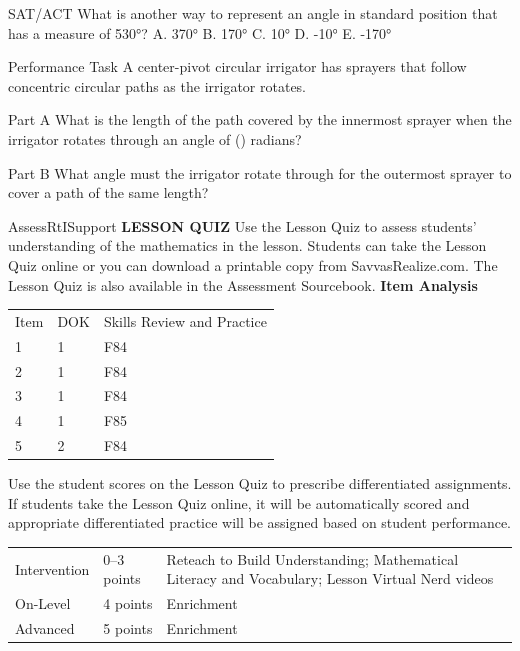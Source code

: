 \documentclass{article}
\newenvironment{practice}[2]{}{}        %
\newenvironment{te-addendum}[2]{}{}     %
\newcommand{\answer}[1]{}               %
\newcommand{\placeholder}[2]{}          %
\begin{document}
\begin{practice}{48}{1}
SAT/ACT What is another way to represent an angle in standard position that has a measure of 530°?
A. 370°
B. 170°
C. 10°
D. -10°
E. -170°
\answer{B}
\end{practice}
\begin{practice}{49}{2}
Performance Task A center-pivot circular irrigator has sprayers that follow concentric circular paths as the irrigator rotates.
\placeholder{illustration}{Green circular crop field in perspective with concentric sprayer paths. Horizontal white radial measure from center to innermost circle is20 m; from that circle to outermost circle is400 m. Other fields and hills in background.}
Part A What is the length of the path covered by the innermost sprayer when the irrigator rotates through an angle of () radians?
\answer{(\approx94) m}
Part B What angle must the irrigator rotate through for the outermost sprayer to cover a path of the same length?
\answer{(\approx0.224) radians}
\end{practice}
\begin{te-addendum}{Assess}{RtISupport}
\textbf{LESSON QUIZ}
Use the Lesson Quiz to assess students' understanding of the mathematics in the lesson.
Students can take the Lesson Quiz online or you can download a printable copy from SavvasRealize.com. The Lesson Quiz is also available in the Assessment Sourcebook.
\textbf{Item Analysis}
\begin{tabular}{lll}
Item & DOK & Skills Review and Practice \\
1 & 1 & F84 \\
2 & 1 & F84 \\
3 & 1 & F84 \\
4 & 1 & F85 \\
5 & 2 & F84 \\
\end{tabular}
Use the student scores on the Lesson Quiz to prescribe differentiated assignments.
If students take the Lesson Quiz online, it will be automatically scored and appropriate differentiated practice will be assigned based on student performance.
\begin{tabular}{lll}
Intervention & 0--3 points & Reteach to Build Understanding; Mathematical Literacy and Vocabulary; Lesson Virtual Nerd videos \\
On-Level & 4 points & Enrichment \\
Advanced & 5 points & Enrichment \\
\end{tabular}
\end{te-addendum}
\end{document}
